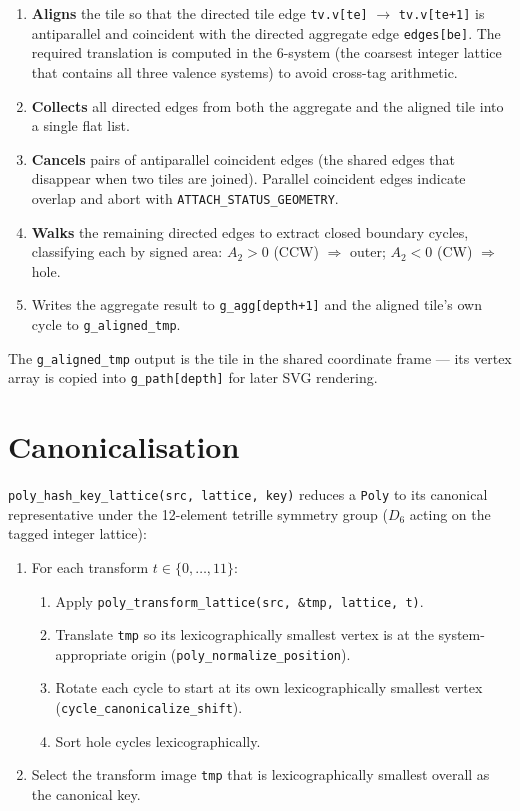 \documentclass[10pt,a4paper]{article}
\let\polysection\section
\renewcommand\section{\needspace{0.16\textheight}\polysection}
\newcommand{\code}[1]{\texttt{\small #1}}
\begin{document}
\begin{enumerate}
  \item \textbf{Aligns} the tile so that the directed tile edge
    \code{tv.v[te]} $\to$ \code{tv.v[te+1]}
    is antiparallel and coincident with the directed aggregate edge
    \code{edges[be]}.  The required translation is computed in the
    6-system (the coarsest integer lattice that contains all three
    valence systems) to avoid cross-tag arithmetic.
  \item \textbf{Collects} all directed edges from both the aggregate
    and the aligned tile into a single flat list.
  \item \textbf{Cancels} pairs of antiparallel coincident edges (the
    shared edges that disappear when two tiles are joined).  Parallel
    coincident edges indicate overlap and abort with \code{ATTACH\_STATUS\_GEOMETRY}.
  \item \textbf{Walks} the remaining directed edges to extract closed
    boundary cycles, classifying each by signed area:
    $A_2 > 0$ (CCW) $\Rightarrow$ outer; $A_2 < 0$ (CW) $\Rightarrow$ hole.
  \item Writes the aggregate result to \code{g\_agg[depth+1]} and the
    aligned tile's own cycle to \code{g\_aligned\_tmp}.
\end{enumerate}

The \code{g\_aligned\_tmp} output is the tile in the shared coordinate
frame — its vertex array is copied into \code{g\_path[depth]} for
later SVG rendering.

\section{Canonicalisation}

\code{poly\_hash\_key\_lattice(src, lattice, key)} reduces a \code{Poly}
to its canonical representative under the 12-element tetrille symmetry
group ($D_6$ acting on the tagged integer lattice):

\begin{enumerate}
  \item For each transform $t \in \{0, \ldots, 11\}$:
    \begin{enumerate}
      \item Apply \code{poly\_transform\_lattice(src, \&tmp, lattice, t)}.
      \item Translate \code{tmp} so its lexicographically smallest
        vertex is at the system-appropriate origin
        (\code{poly\_normalize\_position}).
      \item Rotate each cycle to start at its own lexicographically
        smallest vertex (\code{cycle\_canonicalize\_shift}).
      \item Sort hole cycles lexicographically.
    \end{enumerate}
  \item Select the transform image \code{tmp} that is lexicographically
    smallest overall as the canonical key.
\end{enumerate}
\end{document}
